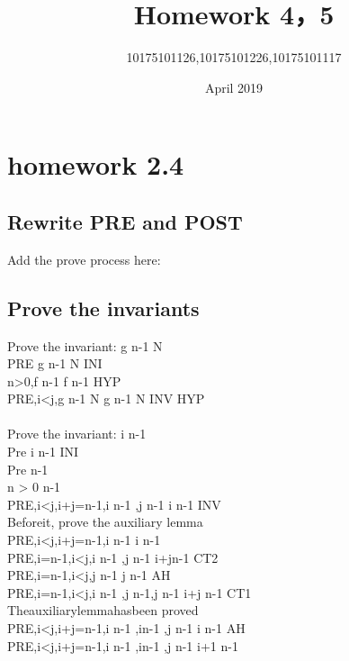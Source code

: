 \documentclass[11pt,a4paper,fleqn]{article}
\title{Homework 4，5}
\author{10175101126,10175101226,10175101117}
\date{April 2019}
\begin{document}
\maketitle

\section{ homework 2.4 }
\subsection{Rewrite PRE and POST }
\noindent
Add the prove process here: \\



\subsection{Prove the invariants}
\noindent
Prove the invariant: g  \upto n-1 \rightarrow N \\
PRE \vdash [g:=f] g  \upto n-1 \rightarrow N \quad INI \\
n>0,f  \upto n-1 \vdash f  \upto n-1 \quad HYP \\
PRE,i<j,g  \upto n-1 \rightarrow N \vdash [g :=(\{i, j\} \domsub g) \cup\{i \mapsto g(j), j \mapsto g(i)\}]g  \upto n-1 \rightarrow N \quad INV \quad HYP\\
\noindent
\\
Prove \; the \; invariant: i  \upto n-1 \\
Pre \vdash [i:=0]i  \upto n-1 \quad INI \\
Pre   \upto n-1 \\
n > 0   \upto n-1 \quad \\
PRE,i<j,i+j=n-1,i \upto n-1 ,j \upto n-1 \vdash [i:=i+1]i \upto n-1 \; INV \\
Before\;it, \; prove \; the \; auxiliary \; lemma \; \\
PRE,i<j,i+j=n-1,i \upto n-1  \vdash i \neq n-1 \\
PRE,i=n-1,i<j,i  \upto n-1 ,j  \upto n-1 \vdash i+j\neq n-1 \;CT2 \\
PRE,i=n-1,i<j,j  \upto n-1 \vdash j  \upto n-1 \;AH \\
PRE,i=n-1,i<j,i  \upto n-1 ,j  \upto n-1,j  \upto n-1 \vdash i+j \neq n-1 \;CT1 \\
The\;auxiliary\;lemma\;has\;been\; proved \\
PRE,i<j,i+j=n-1,i \upto n-1 ,i\neq n-1 ,j \upto n-1 \vdash [i:=i+1]i \upto n-1 \; AH \\
PRE,i<j,i+j=n-1,i \upto n-1 ,i\neq n-1 ,j \upto n-1 \vdash i+1  \upto n-1 \\
\end{document}
